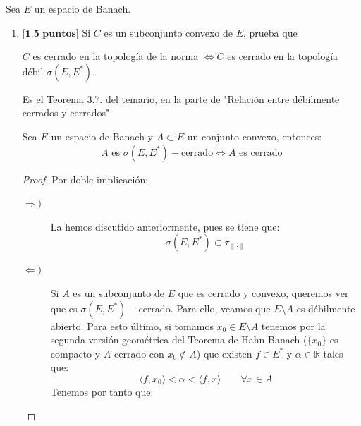 \documentclass[12pt]{article}
\begin{document}
    \begin{ejercicio}
        Sea $E$ un espacio de Banach.
        \begin{enumerate}[label=\alph*)]
            \item $\textbf{[1.5 puntos]}$ Si $C$ es un subconjunto convexo de $E$, prueba que
                \begin{center}
                    $C$ es cerrado en la topología de la norma $\Longleftrightarrow C$ es cerrado en la topología débil $\sigma(E,E^\ast)$.
                \end{center}
                Es el Teorema 3.7. del temario, en la parte de "Relación entre débilmente cerrados y cerrados"
            \begin{teo}
                Sea $E$ un espacio de Banach y $A\subset E$ un conjunto convexo, entonces:
                \begin{equation*}
                    A \text{\ es\ } \sigma(E,E^\ast)-\text{cerrado} \Longleftrightarrow A\text{\ es cerrado}
                \end{equation*}
                \begin{proof}
                    Por doble implicación:
                    \begin{description}
                        \item [$\Longrightarrow )$] La hemos discutido anteriormente, pues se tiene que:
                            \begin{equation*}
                                \sigma(E,E^\ast)\subset \tau_{\|\cdot \|}
                            \end{equation*}
                        \item [$\Longleftarrow )$]  Si $A$ es un subconjunto de $E$ que es cerrado y convexo, queremos ver que es $\sigma(E,E^\ast)-$cerrado. Para ello, veamos que $E\setminus A$ es débilmente abierto. Para esto último, si tomamos $x_0\in E\setminus A$ tenemos por la segunda versión geométrica del Teorema de Hahn-Banach ($\{x_0\}$ es compacto y $A$ cerrado con $x_0\notin A$) que existen $f\in E^\ast$  y $\alpha\in \mathbb{R}$ tales que:
                            \begin{equation*}
                                \langle f,x_0 \rangle < \alpha < \langle f,x \rangle  \qquad \forall x\in A
                            \end{equation*}
                            Tenemos por tanto que:
                            \begin{equation*}

\end{equation*}
\end{description}
\end{proof}
\end{teo}
\end{enumerate}
\end{ejercicio}
\end{document}
